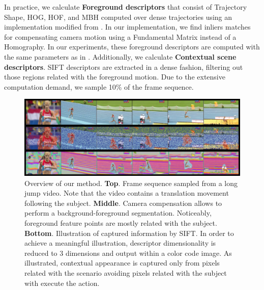 In practice, we calculate \textbf{Foreground descriptors} that consist of Trajectory Shape, HOG, HOF, and MBH computed over dense trajectories using an implementation modified from \cite{wang2013}. In our implementation, we find inliers matches for compensating camera motion using a Fundamental Matrix instead of a Homography. In our experiments, these foreground descriptors are computed with the same parameters as in \cite{wang2013}.
Additionally, we calculate \textbf{Contextual scene descriptors}. SIFT descriptors are extracted in a dense fashion, filtering out those regions related with the foreground motion. Due to the extensive computation demand, we sample 10\% of the frame sequence. 


\begin{figure}[t!]
\begin{center}
\includegraphics[width=0.98\linewidth]{fig/approach.png}
\end{center}
\caption{Overview of our method. \textbf{Top}. Frame sequence sampled from a long jump video. Note that the video contains a translation movement following the subject. \textbf{Middle}. Camera compensation allows to perform a background-foreground segmentation. Noticeably, foreground feature points are mostly related with the subject. \textbf{Bottom}. Illustration of captured information by SIFT. In order to achieve a meaningful illustration, descriptor dimensionality is reduced to 3 dimensions and output within a color code image. As illustrated, contextual appearance is captured only from pixels related with the scenario \ie avoiding pixels related with the subject with execute the action.}
\label{fig:approach}
\end{figure}


